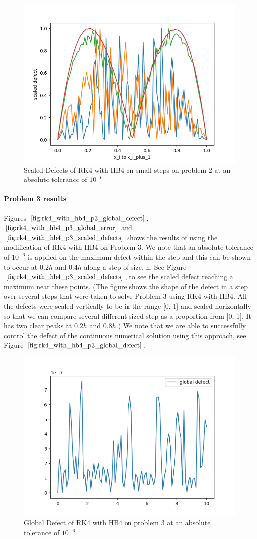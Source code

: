 \documentclass{article}
\begin{document}
\begin{figure}[H]
\centering
\includegraphics[width=0.7\linewidth]{./figures/rk4_with_hb4_p2_scaled_defects_small_steps}
\caption{Scaled Defects of RK4 with HB4 on small steps on problem 2 at an absolute tolerance of $10^{-6}$}
\label{fig:rk4_with_hb4_p2_scaled_defects_small_steps}
\end{figure}

\paragraph{Problem 3 results}
Figures $\ref{fig:rk4_with_hb4_p3_global_defect}$, $\ref{fig:rk4_with_hb4_p3_global_error}$ and $\ref{fig:rk4_with_hb4_p3_scaled_defects}$ shows the results of using the modification of RK4 with HB4 on Problem 3. We note that an absolute tolerance of $10^{-6}$ is applied on the maximum defect within the step and this can be shown to occur at $0.2h$ and $0.4h$ along a step of size, h. See Figure $\ref{fig:rk4_with_hb4_p3_scaled_defects}$, to see the scaled defect reaching a maximum near these points. (The figure shows the shape of the defect in a step over several steps that were taken to solve Problem 3 using RK4 with HB4. All the defects were scaled vertically to be in the range [0, 1] and scaled horizontally so that we can compare several different-sized step as a proportion from [0, 1]. It has two clear peaks at $0.2h$ and $0.8h$.) We note that we are able to successfully control the defect of the continuous numerical solution using this approach, see Figure $\ref{fig:rk4_with_hb4_p3_global_defect}$. 

\begin{figure}[H]
\centering
\includegraphics[width=0.7\linewidth]{./figures/rk4_with_hb4_p3_global_defect}
\caption{Global Defect of RK4 with HB4 on problem 3 at an absolute tolerance of $10^{-6}$}
\label{fig:rk4_with_hb4_p3_global_defect}
\end{figure}
\end{document}
